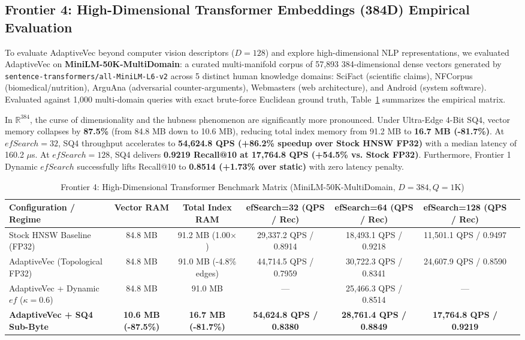 \documentclass[conference,10pt]{IEEEtran}
\begin{document}
\subsection{Frontier 4: High-Dimensional Transformer Embeddings (384D) Empirical Evaluation}
To evaluate AdaptiveVec beyond computer vision descriptors ($D=128$) and explore high-dimensional NLP representations, we evaluated AdaptiveVec on \textbf{MiniLM-50K-MultiDomain}: a curated multi-manifold corpus of 57,893 384-dimensional dense vectors generated by \texttt{sentence-transformers/all-MiniLM-L6-v2} across 5 distinct human knowledge domains: SciFact (scientific claims), NFCorpus (biomedical/nutrition), ArguAna (adversarial counter-arguments), Webmasters (web architecture), and Android (system software). Evaluated against 1,000 multi-domain queries with exact brute-force Euclidean ground truth, Table~\ref{tab:transformer_384d} summarizes the empirical matrix.

In $\mathbb{R}^{384}$, the curse of dimensionality and the hubness phenomenon are significantly more pronounced. Under Ultra-Edge 4-Bit SQ4, vector memory collapses by \textbf{87.5\%} (from 84.8 MB down to 10.6 MB), reducing total index memory from 91.2 MB to \textbf{16.7 MB (-81.7\%)}. At $efSearch=32$, SQ4 throughput accelerates to \textbf{54,624.8 QPS (+86.2\% speedup over Stock HNSW FP32)} with a median latency of 160.2 $\mu$s. At $efSearch=128$, SQ4 delivers \textbf{0.9219 Recall@10 at 17,764.8 QPS (+54.5\% vs. Stock FP32)}. Furthermore, Frontier 1 Dynamic $efSearch$ successfully lifts Recall@10 to \textbf{0.8514 (+1.73\% over static)} with zero latency penalty.

\begin{table}[t]
\caption{Frontier 4: High-Dimensional Transformer Benchmark Matrix (MiniLM-50K-MultiDomain, $D=384, Q=1\text{K}$)}
\label{tab:transformer_384d}
\centering
\begin{tabular}{lcccccc}
\toprule
\textbf{Configuration / Regime} & \textbf{Vector RAM} & \textbf{Total Index RAM} & \textbf{efSearch=32 (QPS / Rec)} & \textbf{efSearch=64 (QPS / Rec)} & \textbf{efSearch=128 (QPS / Rec)} \\
\midrule
Stock HNSW Baseline (FP32) & 84.8 MB & 91.2 MB (1.00$\times$) & 29,337.2 QPS / 0.8914 & 18,493.1 QPS / 0.9218 & 11,501.1 QPS / 0.9497 \\
AdaptiveVec (Topological FP32) & 84.8 MB & 91.0 MB (-4.8\% edges) & 44,714.5 QPS / 0.7959 & 30,722.3 QPS / 0.8341 & 24,607.9 QPS / 0.8590 \\
AdaptiveVec + Dynamic $ef$ ($\kappa=0.6$) & 84.8 MB & 91.0 MB & --- & 25,466.3 QPS / 0.8514 & --- \\
\textbf{AdaptiveVec + SQ4 Sub-Byte} & \textbf{10.6 MB (-87.5\%)} & \textbf{16.7 MB (-81.7\%)} & \textbf{54,624.8 QPS / 0.8380} & \textbf{28,761.4 QPS / 0.8849} & \textbf{17,764.8 QPS / 0.9219} \\
\bottomrule
\end{tabular}
\end{table}
\end{document}
